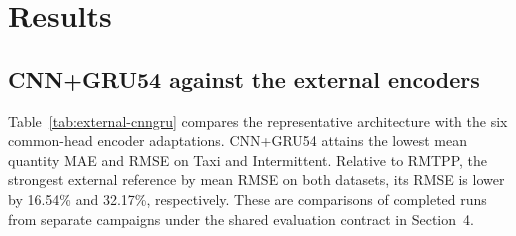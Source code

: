 \documentclass[runningheads]{llncs}
\begin{document}
\section{Results}
\subsection{CNN+GRU54 against the external encoders}
Table~\ref{tab:external-cnngru} compares the representative architecture with the six common-head encoder adaptations. CNN+GRU54 attains the lowest mean quantity MAE and RMSE on Taxi and Intermittent. Relative to RMTPP, the strongest external reference by mean RMSE on both datasets, its RMSE is lower by 16.54\% and 32.17\%, respectively. These are comparisons of completed runs from separate campaigns under the shared evaluation contract in Section~4.
\end{document}
